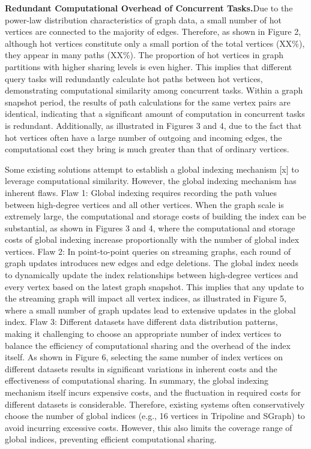 \documentclass[lettersize,journal]{IEEEtran} %
\begin{document}
{\bf{Redundant Computational Overhead of Concurrent Tasks.}}Due to the power-law distribution characteristics of graph data, a small number of hot vertices are connected to the majority of edges. Therefore, as shown in Figure 2, although hot vertices constitute only a small portion of the total vertices (XX\%), they appear in many paths (XX\%). The proportion of hot vertices in graph partitions with higher sharing levels is even higher. This implies that different query tasks will redundantly calculate hot paths between hot vertices, demonstrating computational similarity among concurrent tasks. Within a graph snapshot period, the results of path calculations for the same vertex pairs are identical, indicating that a significant amount of computation in concurrent tasks is redundant. Additionally, as illustrated in Figures 3 and 4, due to the fact that hot vertices often have a large number of outgoing and incoming edges, the computational cost they bring is much greater than that of ordinary vertices.

Some existing solutions attempt to establish a global indexing mechanism [x] to leverage computational similarity. However, the global indexing mechanism has inherent flaws. Flaw 1: Global indexing requires recording the path values between high-degree vertices and all other vertices. When the graph scale is extremely large, the computational and storage costs of building the index can be substantial, as shown in Figures 3 and 4, where the computational and storage costs of global indexing increase proportionally with the number of global index vertices. Flaw 2: In point-to-point queries on streaming graphs, each round of graph updates introduces new edges and edge deletions. The global index needs to dynamically update the index relationships between high-degree vertices and every vertex based on the latest graph snapshot. This implies that any update to the streaming graph will impact all vertex indices, as illustrated in Figure 5, where a small number of graph updates lead to extensive updates in the global index. Flaw 3: Different datasets have different data distribution patterns, making it challenging to choose an appropriate number of index vertices to balance the efficiency of computational sharing and the overhead of the index itself. As shown in Figure 6, selecting the same number of index vertices on different datasets results in significant variations in inherent costs and the effectiveness of computational sharing. In summary, the global indexing mechanism itself incurs expensive costs, and the fluctuation in required costs for different datasets is considerable. Therefore, existing systems often conservatively choose the number of global indices (e.g., 16 vertices in Tripoline and SGraph) to avoid incurring excessive costs. However, this also limits the coverage range of global indices, preventing efficient computational sharing. 
\end{document}
